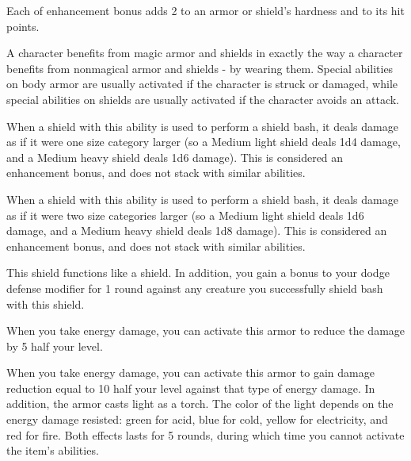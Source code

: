  Each  of enhancement bonus adds 2 to an armor or shield's hardness and  to its hit points.

 A character benefits from magic armor and shields in exactly the way a character benefits from nonmagical armor and shields - by wearing them. Special abilities on body armor are usually activated if the character is struck or damaged, while special abilities on shields are usually activated if the character avoids an attack.

 When a shield with this ability is used to perform a shield bash, it deals damage as if it were one size category larger (so a Medium light shield deals 1d4 damage, and a Medium heavy shield deals 1d6 damage). This is considered an enhancement bonus, and does not stack with similar abilities.


 When a shield with this ability is used to perform a shield bash, it deals damage as if it were two size categories larger (so a Medium light shield deals 1d6 damage, and a Medium heavy shield deals 1d8 damage). This is considered an enhancement bonus, and does not stack with similar abilities.


 This shield functions like a  shield. In addition, you gain a  bonus to your dodge defense modifier for 1 round against any creature you successfully shield bash with this shield.


 When you take energy damage, you can activate this armor to reduce the damage by 5 \add half your level.


 When you take energy damage, you can activate this armor to gain damage reduction equal to 10 \add half your level against that type of energy damage. In addition, the armor casts light as a torch. The color of the light depends on the energy damage resisted: green for acid, blue for cold, yellow for electricity, and red for fire. Both effects lasts for 5 rounds, during which time you cannot activate the item's abilities.

